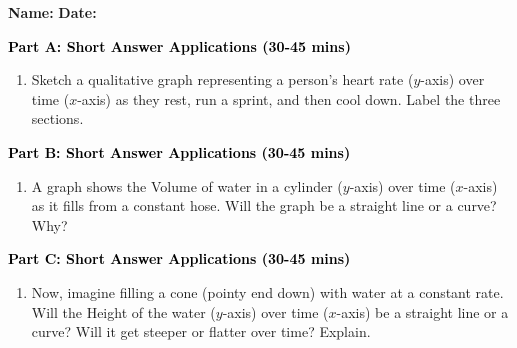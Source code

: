 \documentclass[12pt, letterpaper, fleqn]{article}
\begin{document}
\textbf{Name:} \underline{\hspace{5cm}}
\hfill
\textbf{Date:} \underline{\hspace{3cm}}\\


\begin{tcolorbox}[colback=customteal!20]
\large\textcolor{black}{\textbf{Part A: Short Answer Applications (30-45 mins)}}
\end{tcolorbox}

\vspace{3mm}

\begin{enumerate}[itemsep=4.2cm, leftmargin=0.6cm]
\item Sketch a qualitative graph representing a person's heart rate ($y$-axis) over time ($x$-axis) as they rest, run a sprint, and then cool down. Label the three sections.
\end{enumerate}

\newpage

\begin{tcolorbox}[colback=customteal!20]
\large\textcolor{black}{\textbf{Part B: Short Answer Applications (30-45 mins)}}
\end{tcolorbox}

\vspace{3mm}

\begin{enumerate}[itemsep=4.2cm, leftmargin=0.6cm, resume]
\item A graph shows the Volume of water in a cylinder ($y$-axis) over time ($x$-axis) as it fills from a constant hose. Will the graph be a straight line or a curve? Why?
\end{enumerate}

\newpage

\begin{tcolorbox}[colback=customteal!20]
\large\textcolor{black}{\textbf{Part C: Short Answer Applications (30-45 mins)}}
\end{tcolorbox}

\vspace{3mm}

\begin{enumerate}[itemsep=4.2cm, leftmargin=0.6cm, resume]
\item Now, imagine filling a cone (pointy end down) with water at a constant rate. Will the Height of the water ($y$-axis) over time ($x$-axis) be a straight line or a curve? Will it get steeper or flatter over time? Explain.
\end{enumerate}
\end{document}
